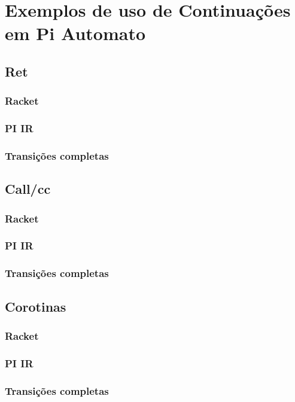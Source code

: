 \chapter{Exemplos de uso de Continuações em Pi Automato}

\section{Ret}
\subsection{Racket}
\subsection{PI IR}
\subsection{Transições completas}
\section{Call/cc}
\subsection{Racket}
\subsection{PI IR}
\subsection{Transições completas}
\section{Corotinas}
\subsection{Racket}
\subsection{PI IR}
\subsection{Transições completas}
